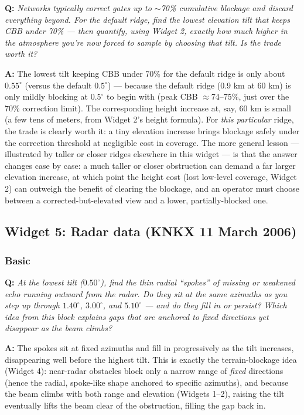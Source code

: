 \documentclass[11pt]{article}
\newenvironment{qa}[1]{\par\noindent\textbf{\color{qgray}Q: }\emph{#1}\par\noindent\textbf{A: }}{\par\vspace{6pt}}
\newcommand{\tier}[1]{\subsubsection*{#1}}
\begin{document}
\begin{qa}{Networks typically correct gates up to $\sim$70\% cumulative blockage and discard everything beyond. For the default ridge, find the lowest elevation tilt that keeps CBB under 70\% --- then quantify, using Widget 2, exactly how much higher in the atmosphere you're now forced to sample by choosing that tilt. Is the trade worth it?}
The lowest tilt keeping CBB under 70\% for the default ridge is only about $0.55^\circ$ (versus the default $0.5^\circ$) --- because the default ridge (0.9 km at 60 km) is only mildly blocking at $0.5^\circ$ to begin with (peak CBB $\approx$74--75\%, just over the 70\% correction limit). The corresponding height increase at, say, 60 km is small (a few tens of meters, from Widget 2's height formula). For \emph{this particular} ridge, the trade is clearly worth it: a tiny elevation increase brings blockage safely under the correction threshold at negligible cost in coverage. The more general lesson --- illustrated by taller or closer ridges elsewhere in this widget --- is that the answer changes case by case: a much taller or closer obstruction can demand a far larger elevation increase, at which point the height cost (lost low-level coverage, Widget 2) can outweigh the benefit of clearing the blockage, and an operator must choose between a corrected-but-elevated view and a lower, partially-blocked one.
\end{qa}

\subsection{Widget 5: Radar data (KNKX 11 March 2006)}

\tier{Basic}
\begin{qa}{At the lowest tilt ($0.50^\circ$), find the thin radial ``spokes'' of missing or weakened echo running outward from the radar. Do they sit at the same azimuths as you step up through $1.40^\circ$, $3.00^\circ$, and $5.10^\circ$ --- and do they fill in or persist? Which idea from this block explains gaps that are anchored to fixed directions yet disappear as the beam climbs?}
The spokes sit at fixed azimuths and fill in progressively as the tilt increases, disappearing well before the highest tilt. This is exactly the terrain-blockage idea (Widget 4): near-radar obstacles block only a narrow range of \emph{fixed} directions (hence the radial, spoke-like shape anchored to specific azimuths), and because the beam climbs with both range and elevation (Widgets 1--2), raising the tilt eventually lifts the beam clear of the obstruction, filling the gap back in.
\end{qa}
\end{document}
